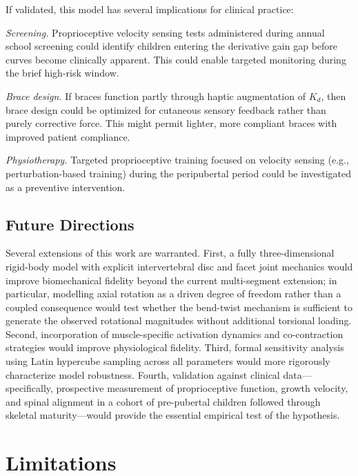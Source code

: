 \documentclass[12pt,a4paper]{article}
\begin{document}
If validated, this model has several implications for clinical practice:

\textit{Screening.} Proprioceptive velocity sensing tests administered during annual school screening could identify children entering the derivative gain gap before curves become clinically apparent. This could enable targeted monitoring during the brief high-risk window.

\textit{Brace design.} If braces function partly through haptic augmentation of $K_d$, then brace design could be optimized for cutaneous sensory feedback rather than purely corrective force. This might permit lighter, more compliant braces with improved patient compliance.

\textit{Physiotherapy.} Targeted proprioceptive training focused on velocity sensing (e.g., perturbation-based training) during the peripubertal period could be investigated as a preventive intervention.

\subsection{Future Directions}

Several extensions of this work are warranted. First, a fully three-dimensional rigid-body model with explicit intervertebral disc and facet joint mechanics would improve biomechanical fidelity beyond the current multi-segment extension; in particular, modelling axial rotation as a driven degree of freedom rather than a coupled consequence would test whether the bend-twist mechanism is sufficient to generate the observed rotational magnitudes without additional torsional loading. Second, incorporation of muscle-specific activation dynamics and co-contraction strategies would improve physiological fidelity. Third, formal sensitivity analysis using Latin hypercube sampling across all parameters would more rigorously characterize model robustness. Fourth, validation against clinical data---specifically, prospective measurement of proprioceptive function, growth velocity, and spinal alignment in a cohort of pre-pubertal children followed through skeletal maturity---would provide the essential empirical test of the hypothesis.

\section{Limitations}
\end{document}
